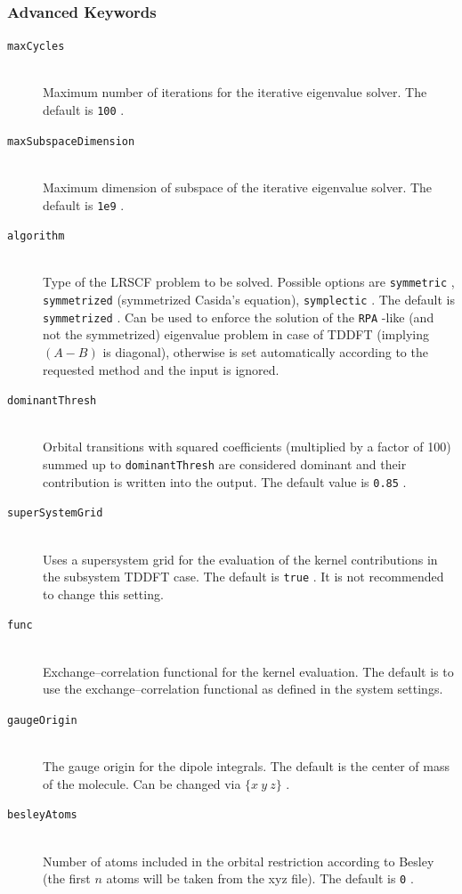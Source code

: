 \documentclass[bibliography=totocnumbered,a4paper,10pt,oneside]{scrbook}
\newcommand{\ttt}[1]{%
  \begingroup\setlength{\fboxsep}{1pt}%
  \colorbox{serenity-green!30}{\texttt{\hspace*{2pt}\vphantom{(g}#1\hspace*{2pt}}}%
  \endgroup
}
\begin{document}
\subsubsection{Advanced Keywords}
\begin{description}
    \item [\texttt{maxCycles}]\hfill \\
    Maximum number of iterations for the iterative eigenvalue solver. The default is \ttt{100}.
    \item [\texttt{maxSubspaceDimension}]\hfill \\
    Maximum dimension of subspace of the iterative eigenvalue solver. The default is \ttt{1e9}.
    \item [\texttt{algorithm}]\hfill \\
    Type of the LRSCF problem to be solved. Possible options are \ttt{symmetric}, \ttt{symmetrized} (symmetrized Casida's equation), \ttt{symplectic}. The default is \ttt{symmetrized}. Can be used to enforce the solution of the \ttt{RPA}-like (and not the symmetrized) eigenvalue problem in case of TDDFT (implying $(A-B)$ is diagonal), otherwise is set automatically according to the requested method and the input is ignored.
    \item [\texttt{dominantThresh}]\hfill \\
    Orbital transitions with squared coefficients (multiplied by a factor of 100) summed up to \ttt{dominantThresh} are considered dominant and their contribution is written into the output. The default value is \ttt{0.85}.
    \item [\texttt{superSystemGrid}]\hfill \\
    Uses a supersystem grid for the evaluation of the kernel contributions in the subsystem TDDFT case. The default is \ttt{true}. It is not recommended to change this setting.
    \item [\texttt{func}]\hfill \\
    Exchange--correlation functional for the kernel evaluation. The default is to use the exchange--correlation functional as defined in the system settings.
    \item [\texttt{gaugeOrigin}]\hfill \\
    The gauge origin for the dipole integrals. The default is the center of mass of the molecule. Can be changed via \ttt{$\{x~y~z\}$}.
    \item [\texttt{besleyAtoms}]\hfill \\
    Number of atoms included in the orbital restriction according to Besley (the first $n$ atoms will be taken from the xyz file). The default is \ttt{0}.

\end{description}
\end{document}
